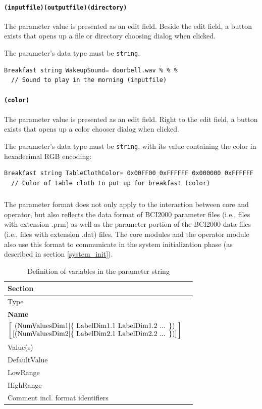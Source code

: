\documentclass[letterpaper,oneside,12pt]{book}
\begin{document}
\paragraph{\texttt{(inputfile)(outputfile)(directory)}}
The parameter value is presented as an edit field. Beside the edit field, a button
exists that opens up a file or directory choosing dialog when clicked.

The parameter's data type must be \texttt{string}.
\begin{verbatim}
Breakfast string WakeupSound= doorbell.wav % % %
  // Sound to play in the morning (inputfile)
\end{verbatim}

\paragraph{\texttt{(color)}}
The parameter value is presented as an edit field. Right to the edit field, a button
exists that opens up a color chooser dialog when clicked.

The parameter's data type must be \texttt{string}, with its value containing the color
in hexadecimal RGB encoding:
\begin{verbatim}
Breakfast string TableClothColor= 0x00FF00 0xFFFFFF 0x000000 0xFFFFFF
  // Color of table cloth to put up for breakfast (color)
\end{verbatim}

\subsubsection{}
The parameter format does not only apply to the interaction between core and 
operator, but also reflects the data format of BCI2000 parameter files (i.e., 
files with extension .prm) as well as the parameter portion of the BCI2000 data 
files (i.e., files with extension .dat) files. The core modules and the operator 
module also use this format to communicate in the system initialization phase 
(as described in section \ref{system_init}).

\begin{table}[ht]
 \centering
 \begin{tabular}{|l|l|}
  \hline
  Section \\
  \hline
  Type \\
  \hline
  \textbf{Name} \\
  \hline
  ${\left[
    \mbox{(NumValuesDim1$\mid$\{ LabelDim1.1 LabelDim1.2 ... \})}
    \atop
    \mbox{[(NumValuesDim2$\mid$\{ LabelDim2.1 LabelDim2.2 ... \})]}
    \right]}$ \\
  \hline
  Value(s) \\
  \hline
  DefaultValue \\
  \hline
  LowRange \\
  \hline
  HighRange \\
  \hline
  Comment incl. format identifiers \\
  \hline
 \end{tabular}
 \caption{Definition of variables in the parameter string}
 \label{tab:parametervariables}
\end{table}   
\end{document}
